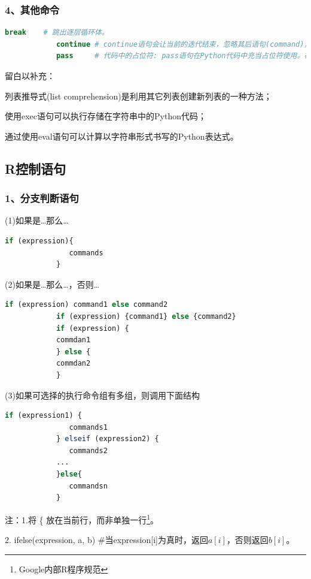         \subsubsection{4、其他命令}
            \begin{lstlisting}[language = Python]
            break    # 跳出逐层循环体。
            continue # continue语句会让当前的迭代结束，忽略其后语句(command)，直接开始下一轮的循环。如果是条件循环(while)，验证条件表达式expression；如果是迭代循环(for)，验证是否还有元素可以迭代，如果验证有，则进行迭代。
            pass     # 代码中的占位符: pass语句在Python代码中充当占位符使用。在不要执行任何东西时可以暂时使用pass语句来填充。
            \end{lstlisting}
            留白以补充：\par
            列表推导式(list comprehension)是利用其它列表创建新列表的一种方法；\par
            使用exec语句可以执行存储在字符串中的Python代码；\par
            通过使用eval语句可以计算以字符串形式书写的Python表达式。
    \subsection{R控制语句}
        \subsubsection{1、分支判断语句}
            \par
            (1)如果是…那么…
                \begin{lstlisting}[language=R]
            if (expression){
               commands
            }
            \end{lstlisting}
            \par
            (2)如果是…那么…，否则…
            \begin{lstlisting}[language = R]
            if (expression) command1 else command2
            if (expression) {command1} else {command2}
            if (expression) {
            commdan1
            } else {
            commdan2
            }
            \end{lstlisting}
            \par
            (3)如果可选择的执行命令组有多组，则调用下面结构
            \begin{lstlisting}[language = R]
            if (expression1) {
               commands1
            } elseif (expression2) {
               commands2
            ...
            }else{
               commandsn
            }
            \end{lstlisting}
            注：1.将 \{ 放在当前行，而非单独一行\footnote{Google内部R程序规范}。
            \par
            2. ifelse(expression, a, b) \#当expression[i]为真时，返回$a[i]$，否则返回$b[i]$。
